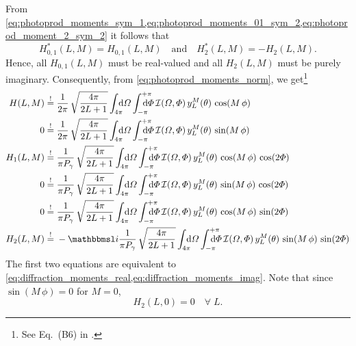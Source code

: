 From
\cref{eq:photoprod_moments_sym_1,eq:photoprod_moments_01_sym_2,eq:photoprod_moment_2_sym_2}
it follows that
\begin{equation}
  \label{eq:photoprodP_moments_real_imag}
  H_{0, 1}^*(L, M)
  = H_{0, 1}(L, M)
  \quad\text{and}\quad
  H_2^*(L, M)
  = -H_2(L, M).
\end{equation}
Hence, all $H_{0, 1}(L, M)$ must be real-valued and all $H_2(L, M)$
must be purely imaginary.  Consequently, from
\cref{eq:photoprod_moments_norm}, we get\footnote{See Eq.~(B6) in
.}
\begin{align}
  \label{eq:photoprod_moment_0_real}
  H(L, M)
  \mustBeEq{}& \frac{1}{2 \pi}\, \sqrt{\frac{4 \pi}{2 L + 1}} \int_{4 \pi}\!\!\!\! \dif{\Omega} \int_{-\pi}^{+\pi}\hspace{-1.2em} \dif{\Phi}\,
  \intensity(\Omega, \Phi)\, y_L^M(\theta)\, \cos(M\, \phi)
  \\
  \label{eq:photoprod_moment_0_imag}
  0
  \mustBeEq{}& \frac{1}{2 \pi}\, \sqrt{\frac{4 \pi}{2 L + 1}} \int_{4 \pi}\!\!\!\! \dif{\Omega} \int_{-\pi}^{+\pi}\hspace{-1.2em} \dif{\Phi}\,
  \intensity(\Omega, \Phi)\, y_L^M(\theta)\, \sin(M\, \phi)
  \\
  \label{eq:photoprod_moment_1_real}
  H_1(L, M)
  \mustBeEq{}& \frac{1}{\pi P_\gamma}\, \sqrt{\frac{4 \pi}{2 L + 1}} \int_{4 \pi}\!\!\!\! \dif{\Omega} \int_{-\pi}^{+\pi}\hspace{-1.2em} \dif{\Phi}\,
  \intensity(\Omega, \Phi)\, y_L^M(\theta)\, \cos(M\, \phi)\, \cos(2 \Phi)
  \\
  \label{eq:photoprod_moment_1_imag}
  0
  \mustBeEq{}& \frac{1}{\pi P_\gamma}\, \sqrt{\frac{4 \pi}{2 L + 1}} \int_{4 \pi}\!\!\!\! \dif{\Omega} \int_{-\pi}^{+\pi}\hspace{-1.2em} \dif{\Phi}\,
  \intensity(\Omega, \Phi)\, y_L^M(\theta)\, \sin(M\, \phi)\, \cos(2 \Phi)
  \\
  \label{eq:photoprod_moment_2_real}
  0
  \mustBeEq{}& \frac{1}{\pi P_\gamma}\, \sqrt{\frac{4 \pi}{2 L + 1}} \int_{4 \pi}\!\!\!\! \dif{\Omega} \int_{-\pi}^{+\pi}\hspace{-1.2em} \dif{\Phi}\,
  \intensity(\Omega, \Phi)\, y_L^M(\theta)\, \cos(M\, \phi)\, \sin(2 \Phi)
  \\
  \label{eq:photoprod_moment_2_imag}
  H_2(L, M)
  \mustBeEq{}& -\imag \frac{1}{\pi P_\gamma}\, \sqrt{\frac{4 \pi}{2 L + 1}} \int_{4 \pi}\!\!\!\! \dif{\Omega} \int_{-\pi}^{+\pi}\hspace{-1.2em} \dif{\Phi}\,
  \intensity(\Omega, \Phi)\, y_L^M(\theta)\, \sin(M\, \phi)\, \sin(2 \Phi)
\end{align}
The first two equations are equivalent to
\cref{eq:diffraction_moments_real,eq:diffraction_moments_imag}.  Note
that since $\sin(M\, \phi) = 0$ for $M = 0$,
\begin{equation}
  \label{eq:photoprod_moment_2_M0}
  H_2(L, 0) = 0
  \quad\forall\; L.
\end{equation}

